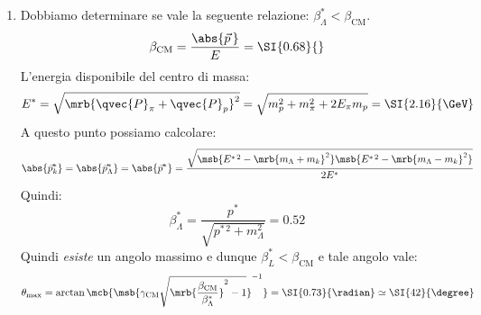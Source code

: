 \begin{example}[]
\begin{enumerate}
    \item Dobbiamo determinare se vale la seguente relazione: $\beta^\ast
      _{\Lambda} < \beta _\text{CM}$.
      \[
        \beta _\text{CM} = \frac{\abs{\vec{p}\,}}{E} = \SI{0.68}{}
      \]
      L'energia disponibile del centro di massa:
      \[
        E ^{\ast} = \sqrt{\mrb{\qvec{P}_{\pi} + \qvec{P}_{p}}^{2}} = \sqrt{m
        _{p}^{2} + m _{\pi}^{2} + 2 E _{\pi} m _{p}} = \SI{2.16}{\GeV}
      \]
      A questo punto possiamo calcolare:
      \[
        \abs{\vec{p}_{k}^{\ast}} = \abs{\vec{p}_{\Lambda}^{\ast}} =
        \abs{\vec{p}^{\ast}} = \frac{\sqrt{\msb{E ^{\ast\,2} - \mrb{m
        _{\Lambda} + m_k}^{2}} \msb{E ^{\ast\,2} - \mrb{m _{\Lambda} - m
        _{k}}^{2}}}}{2 E^\ast}
      \]
      Quindi:
      \[
        \beta _{\Lambda}^{\ast} = \frac{p ^{\ast}}{\sqrt{p ^{\ast\, 2} + m
        _{\Lambda}^{2}}} = 0.52
      \]
      Quindi \textit{esiste} un angolo massimo e dunque $\beta _{L}^{\ast} <
      \beta _\text{CM}$ e tale angolo vale:
      \[
        \theta _\text{max} = \arctan \mcb{\msb{\gamma _\text{CM}
        \sqrt{\mrb{\frac{\beta _\text{CM}}{\beta ^{\ast}_{\Lambda}}}^{2} -
        1}}^{-1}} = \SI{0.73}{\radian} \simeq \SI{42}{\degree}
      \]
  \end{enumerate}
\end{example}

